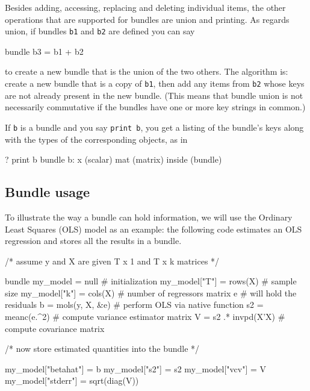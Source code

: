 Besides adding, accessing, replacing and deleting individual items,
the other operations that are supported for bundles are union and
printing. As regards union, if bundles \texttt{b1} and \texttt{b2} are
defined you can say

\begin{code}
bundle b3 = b1 + b2
\end{code}

to create a new bundle that is the union of the two others. The
algorithm is: create a new bundle that is a copy of \texttt{b1}, then
add any items from \texttt{b2} whose keys are not already present in
the new bundle. (This means that bundle union is not necessarily
commutative if the bundles have one or more key strings in common.)

If \texttt{b} is a bundle and you say \texttt{print b}, you get a
listing of the bundle's keys along with the types of the corresponding
objects, as in

\begin{code}
? print b
bundle b:
 x (scalar)
 mat (matrix)
 inside (bundle)
\end{code}

\subsection{Bundle usage}
\label{sec:bundle-usage}

To illustrate the way a bundle can hold information, we will use the
Ordinary Least Squares (OLS) model as an example: the following code
estimates an OLS regression and stores all the results in a bundle.

\begin{code}
/* assume y and X are given T x 1 and T x k matrices */

bundle my_model = null               # initialization
my_model["T"] = rows(X)              # sample size
my_model["k"] = cols(X)              # number of regressors
matrix e                             # will hold the residuals
b = mols(y, X, &e)                   # perform OLS via native function
s2 = meanc(e.^2)                     # compute variance estimator
matrix V = s2 .* invpd(X'X)          # compute covariance matrix

/* now store estimated quantities into the bundle */

my_model["betahat"] = b
my_model["s2"] = s2
my_model["vcv"] = V
my_model["stderr"] = sqrt(diag(V))
\end{code}

